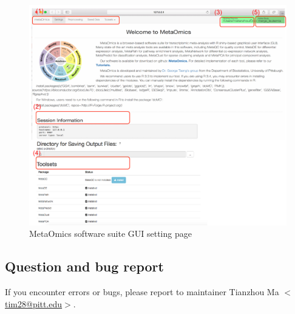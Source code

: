 \begin{figure}[H]
\begin{center}
\includegraphics[scale=0.9]{./figure/preprocessing/GUIsetting}
\caption{MetaOmics software suite GUI setting page}
\label{fig:GUIsetting}
\end{center}
\end{figure}


\subsection{Question and bug report}

If you encounter errors or bugs, please report to maintainer Tianzhou Ma $<$\url{tim28@pitt.edu}$>$.


 
